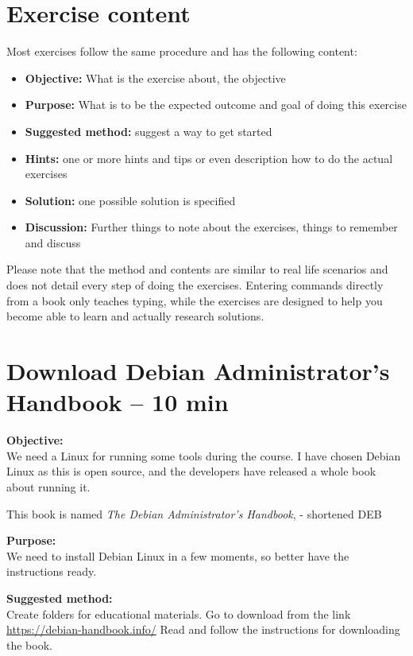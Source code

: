 \documentclass[a4paper,11pt,notitlepage]{report}
\begin{document}
\chapter*{\color{titlecolor}Exercise content}

Most exercises follow the same procedure and has the following content:
\begin{itemize}
\item {\bf Objective:} What is the exercise about, the objective
\item {\bf Purpose:} What is to be the expected outcome and goal of doing this exercise
\item {\bf Suggested method:} suggest a way to get started
\item {\bf Hints:} one or more hints and tips or even description how to
do the actual exercises
\item {\bf Solution:} one possible solution is specified
\item {\bf Discussion:} Further things to note about the exercises, things to remember and discuss
\end{itemize}

Please note that the method and contents are similar to real life scenarios and does not detail every step of doing the exercises. Entering commands directly from a book only teaches typing, while the exercises are designed to help you become able to learn and actually research solutions.


\chapter{Download Debian Administrator’s Handbook -- 10 min}
\label{ex:sw-downloadDEB}



{\bf Objective:}\\
We need a Linux for running some tools during the course. I have chosen Debian Linux as this is open source, and the developers have released a whole book about running it.

This book is named
\emph{The Debian Administrator’s Handbook},  - shortened DEB

{\bf Purpose:}\\
We need to install Debian Linux in a few moments, so better have the instructions ready.

{\bf Suggested method:}\\
Create folders for educational materials. Go to download from the link \url{https://debian-handbook.info/}
Read and follow the instructions for downloading the book.
\end{document}
